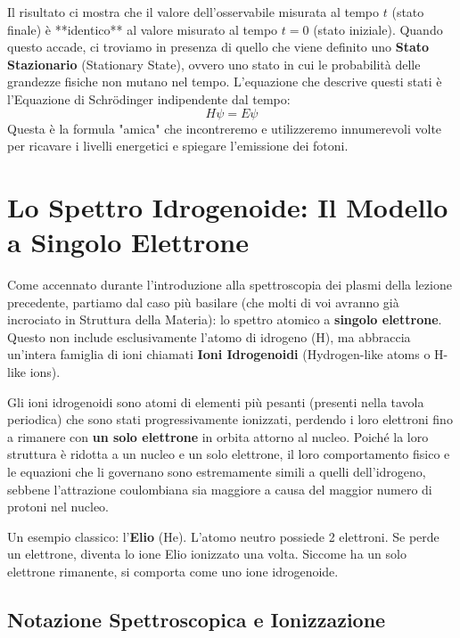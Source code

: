 Il risultato ci mostra che il valore dell'osservabile misurata al tempo $t$ (stato finale) è **identico** al valore misurato al tempo $t=0$ (stato iniziale).
Quando questo accade, ci troviamo in presenza di quello che viene definito uno \textbf{Stato Stazionario} (Stationary State), ovvero uno stato in cui le probabilità delle grandezze fisiche non mutano nel tempo.
L'equazione che descrive questi stati è l'Equazione di Schrödinger indipendente dal tempo:
\begin{equation}
H \psi = E \psi
\end{equation}
Questa è la formula "amica" che incontreremo e utilizzeremo innumerevoli volte per ricavare i livelli energetici e spiegare l'emissione dei fotoni.

\section{Lo Spettro Idrogenoide: Il Modello a Singolo Elettrone}

Come accennato durante l'introduzione alla spettroscopia dei plasmi della lezione precedente, partiamo dal caso più basilare (che molti di voi avranno già incrociato in Struttura della Materia): lo spettro atomico a \textbf{singolo elettrone}.
Questo non include esclusivamente l'atomo di idrogeno (H), ma abbraccia un'intera famiglia di ioni chiamati \textbf{Ioni Idrogenoidi} (Hydrogen-like atoms o H-like ions).

Gli ioni idrogenoidi sono atomi di elementi più pesanti (presenti nella tavola periodica) che sono stati progressivamente ionizzati, perdendo i loro elettroni fino a rimanere con \textbf{un solo elettrone} in orbita attorno al nucleo.
Poiché la loro struttura è ridotta a un nucleo e un solo elettrone, il loro comportamento fisico e le equazioni che li governano sono estremamente simili a quelli dell'idrogeno, sebbene l'attrazione coulombiana sia maggiore a causa del maggior numero di protoni nel nucleo.

Un esempio classico: l'\textbf{Elio} (He). L'atomo neutro possiede 2 elettroni. Se perde un elettrone, diventa lo ione Elio ionizzato una volta. Siccome ha un solo elettrone rimanente, si comporta come uno ione idrogenoide.

\subsection{Notazione Spettroscopica e Ionizzazione}


